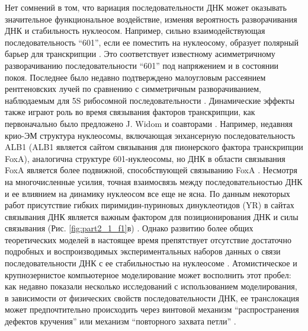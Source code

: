     Нет сомнений в том, что вариация последовательности ДНК может оказывать значительное функциональное воздействие, изменяя вероятность разворачивания ДНК и стабильность нуклеосом. Например, сильно взаимодействующая последовательность ``601'', если ее поместить на нуклеосому, образует полярный барьер для транскрипции \cite{bondarenko_nucleosomes_2006}. Это соответствует известному асимметричному разворачиванию последовательности ``601'' под напряжением \cite{ngo_asymmetric_2015} и в состоянии покоя. Последнее было недавно подтверждено малоугловым рассеянием рентгеновских лучей по сравнению с симметричным разворачиванием, наблюдаемым для 5S рибосомной последовательности \cite{mauney_local_2018}. Динамические эффекты также играют роль во время связывания факторов транскрипции, как первоначально было предложено J. Widom и соавторами \cite{polach_mechanism_1995}. Например, недавняя крио-ЭМ структура нуклеосомы, включающая энхансерную последовательность ALB1 (ALB1 является сайтом связывания для пионерского фактора транскрипции FoxA), аналогична структуре 601-нуклеосомы, но ДНК в области связывания FoxA является более подвижной, способствующей связыванию FoxA \cite{takizawa_cryo-em_2018}. Несмотря на многочисленные усилия, точная взаимосвязь между последовательностью ДНК и ее влиянием на динамику нуклеосом все еще не ясна. По данным некоторых работ присутствие гибких пиримидин-пуриновых динуклеотидов (YR) в сайтах связывания ДНК является важным фактором для позиционирования ДНК и силы связывания (Рис. \ref{fig:part2_1_f1}в) \cite{cui_structure-based_2010,segal_dna_2009}. Однако развитию более общих теоретических моделей в настоящее время препятствует отсутствие достаточно подробных и воспроизводимых экспериментальных наборов данных о связи последовательности ДНК с ее стабильностью на нуклеосоме \cite{eslami-mossallam_nucleosome_2016}. Атомистическое и крупнозернистое компьютерное моделирование может восполнить этот пробел: как недавно показали несколько исследований с использованием моделирования, в зависимости от физических свойств последовательности ДНК, ее транслокация может предпочтительно происходить через винтовой механизм ``распространения дефектов кручения'' или механизм ``повторного захвата петли'' \cite{lequieu_silico_2017,niina_sequence-dependent_2017}.

